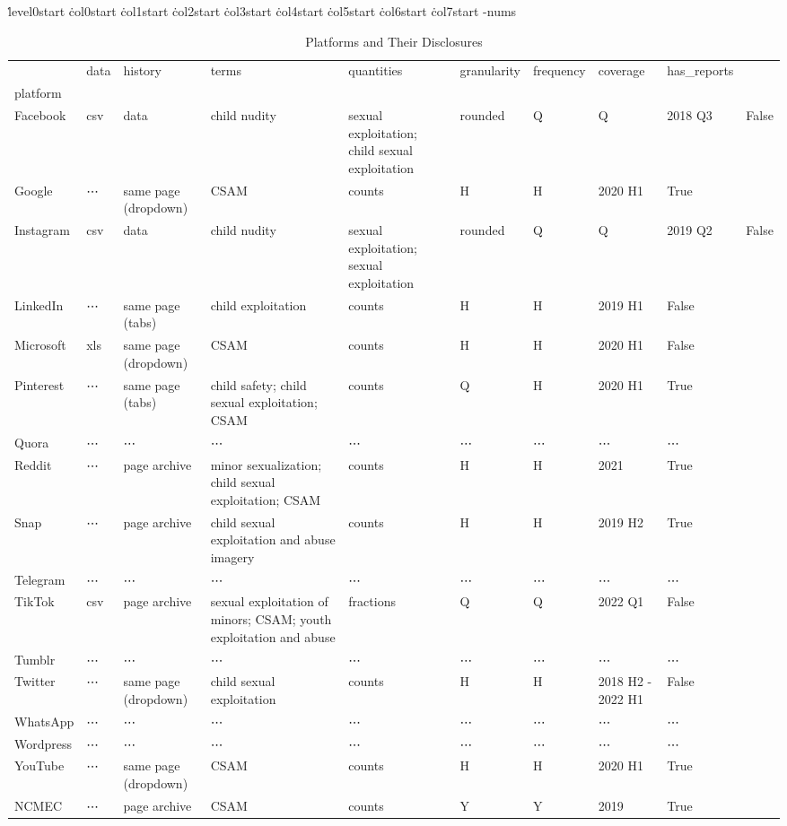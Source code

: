 \begin{table}
\centering
\caption{Platforms and Their Disclosures}
\.level0start
\.col0start
\.col1start
\.col2start
\.col3start
\.col4start
\.col5start
\.col6start
\.col7start
\tabular-nums
\begin{tabular}{lllllllll}
 & data & history & terms & quantities & granularity & frequency & coverage & has_reports \\
platform &  &  &  &  &  &  &  &  \\
Facebook & csv & data & child nudity & sexual exploitation; child sexual exploitation & rounded & Q & Q & 2018 Q3 & False \\
Google & ⋯ & same page (dropdown) & CSAM & counts & H & H & 2020 H1 & True \\
Instagram & csv & data & child nudity & sexual exploitation; sexual exploitation & rounded & Q & Q & 2019 Q2 & False \\
LinkedIn & ⋯ & same page (tabs) & child exploitation & counts & H & H & 2019 H1 & False \\
Microsoft & xls & same page (dropdown) & CSAM & counts & H & H & 2020 H1 & False \\
Pinterest & ⋯ & same page (tabs) & child safety; child sexual exploitation; CSAM & counts & Q & H & 2020 H1 & True \\
Quora & ⋯ & ⋯ & ⋯ & ⋯ & ⋯ & ⋯ & ⋯ & ⋯ \\
Reddit & ⋯ & page archive & minor sexualization; child sexual exploitation; CSAM & counts & H & H & 2021 & True \\
Snap & ⋯ & page archive & child sexual exploitation and abuse imagery & counts & H & H & 2019 H2 & True \\
Telegram & ⋯ & ⋯ & ⋯ & ⋯ & ⋯ & ⋯ & ⋯ & ⋯ \\
TikTok & csv & page archive & sexual exploitation of minors; CSAM; youth exploitation and abuse & fractions & Q & Q & 2022 Q1 & False \\
Tumblr & ⋯ & ⋯ & ⋯ & ⋯ & ⋯ & ⋯ & ⋯ & ⋯ \\
Twitter & ⋯ & same page (dropdown) & child sexual exploitation & counts & H & H & 2018 H2 - 2022 H1 & False \\
WhatsApp & ⋯ & ⋯ & ⋯ & ⋯ & ⋯ & ⋯ & ⋯ & ⋯ \\
Wordpress & ⋯ & ⋯ & ⋯ & ⋯ & ⋯ & ⋯ & ⋯ & ⋯ \\
YouTube & ⋯ & same page (dropdown) & CSAM & counts & H & H & 2020 H1 & True \\
NCMEC & ⋯ & page archive & CSAM & counts & Y & Y & 2019 & True \\
\end{tabular}
\end{table}

